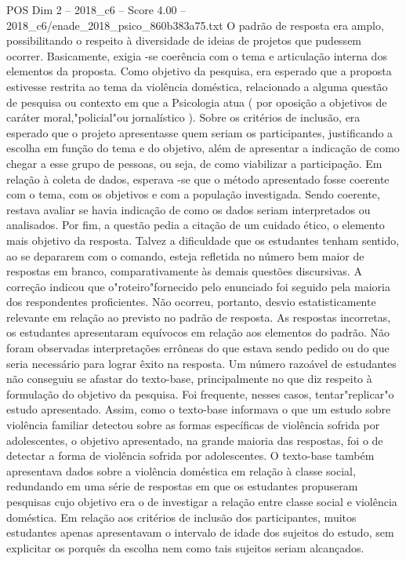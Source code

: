 \begin{textsample}{POS Dim 2 – 2018\_c6 – Score 4.00 – 2018\_c6/enade\_2018\_psico\_860b383a75.txt}
O padrão de resposta era amplo, possibilitando o respeito à diversidade de ideias de projetos que pudessem ocorrer.
Basicamente, exigia -se coerência com o tema e articulação interna dos elementos da proposta.
Como objetivo da pesquisa, era esperado que a proposta estivesse restrita ao tema da violência doméstica, relacionado a alguma questão de pesquisa ou contexto em que a Psicologia atua ( por oposição a objetivos de caráter moral,"policial"ou jornalístico ).
Sobre os critérios de inclusão, era esperado que o projeto apresentasse quem seriam os participantes, justificando a escolha em função do tema e do objetivo, além de apresentar a indicação de como chegar a esse grupo de pessoas, ou seja, de como viabilizar a participação.
Em relação à coleta de dados, esperava -se que o método apresentado fosse coerente com o tema, com os objetivos e com a população investigada.
Sendo coerente, restava avaliar se havia indicação de como os dados seriam interpretados ou analisados.
Por fim, a questão pedia a citação de um cuidado ético, o elemento mais objetivo da resposta.
Talvez a dificuldade que os estudantes tenham sentido, ao se depararem com o comando, esteja refletida no número bem maior de respostas em branco, comparativamente às demais questões discursivas.
A correção indicou que o"roteiro"fornecido pelo enunciado foi seguido pela maioria dos respondentes proficientes.
Não ocorreu, portanto, desvio estatisticamente relevante em relação ao previsto no padrão de resposta.
As respostas incorretas, os estudantes apresentaram equívocos em relação aos elementos do padrão.
Não foram observadas interpretações errôneas do que estava sendo pedido ou do que seria necessário para lograr êxito na resposta.
Um número razoável de estudantes não conseguiu se afastar do texto-base, principalmente no que diz respeito à formulação do objetivo da pesquisa.
Foi frequente, nesses casos, tentar"replicar"o estudo apresentado.
Assim, como o texto-base informava o que um estudo sobre violência familiar detectou sobre as formas específicas de violência sofrida por adolescentes, o objetivo apresentado, na grande maioria das respostas, foi o de detectar a forma de violência sofrida por adolescentes.
O texto-base também apresentava dados sobre a violência doméstica em relação à classe social, redundando em uma série de respostas em que os estudantes propuseram pesquisas cujo objetivo era o de investigar a relação entre classe social e violência doméstica.
Em relação aos critérios de inclusão dos participantes, muitos estudantes apenas apresentavam o intervalo de idade dos sujeitos do estudo, sem explicitar os porquês da escolha nem como tais sujeitos seriam alcançados.

\end{textsample}
